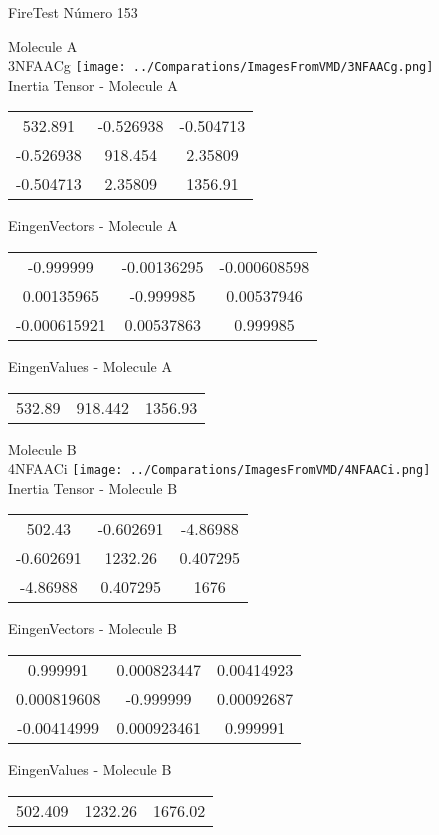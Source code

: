\vtab[-2cm]
\begin{center}
{\large FireTest \tab Número 153}
\end{center}
\begin{multicols}{2}
\begin{center}

Molecule A \\ 
3NFAACg
\texttt{[image: ../Comparations/ImagesFromVMD/3NFAACg.png]}
\\
Inertia Tensor - Molecule A \\
\vtab

\begin{tabular}{|c c c|}
532.891	 & 	-0.526938	 & 	-0.504713	 \\
-0.526938	 & 	918.454	 & 	2.35809	 \\
-0.504713	 & 	2.35809	 & 	1356.91
\end{tabular}

\vtab
 EingenVectors - Molecule A     \\
\vtab
\begin{tabular}{|c c c|}
-0.999999	 & 	-0.00136295	 & 	-0.000608598	 \\
0.00135965	 & 	-0.999985	 & 	0.00537946	 \\
-0.000615921	 & 	0.00537863	 & 	0.999985
\end{tabular}

\vtab
 EingenValues - Molecule A     \\
\vtab
\begin{tabular}{|c c c|}
532.89	 & 	918.442	 & 	1356.93	 \\
\end{tabular}
\columnbreak

Molecule B \\ 
4NFAACi
\texttt{[image: ../Comparations/ImagesFromVMD/4NFAACi.png]}
\\
Inertia Tensor - Molecule B \\
\vtab

\begin{tabular}{|c c c|}
502.43	 & 	-0.602691	 & 	-4.86988	 \\
-0.602691	 & 	1232.26	 & 	0.407295	 \\
-4.86988	 & 	0.407295	 & 	1676
\end{tabular}

\vtab
 EingenVectors - Molecule B     \\
\vtab
\begin{tabular}{|c c c|}
0.999991	 & 	0.000823447	 & 	0.00414923	 \\
0.000819608	 & 	-0.999999	 & 	0.00092687	 \\
-0.00414999	 & 	0.000923461	 & 	0.999991
\end{tabular}

\vtab
 EingenValues - Molecule B     \\
\vtab
\begin{tabular}{|c c c|}
502.409	 & 	1232.26	 & 	1676.02	 \\
\end{tabular}

\end{center}
\end{multicols}
